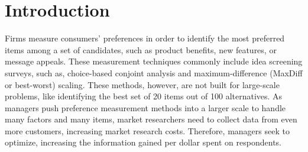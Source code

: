 \documentclass[a4paper,12pt]{article}
\begin{document}
%


\newpage

\section{Introduction}


Firms measure consumers' preferences in order to identify the most preferred items among a set of candidates, such as product benefits, new features, or message appeals. These measurement techniques commonly include idea screening surveys, such as, choice-based conjoint analysis and maximum-difference (MaxDiff or best-worst) scaling. These methods, however, are not built for large-scale problems, like identifying the best set of 20 items out of 100 alternatives. As managers push preference measurement methods into a larger scale to handle many factors and many items, market researchers need to collect data from even more customers, increasing market research costs. Therefore, managers seek to optimize, increasing the information gained per dollar spent on respondents. 
\end{document}
